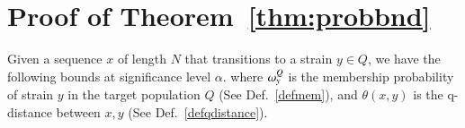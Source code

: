 \documentclass[onecolumn,10pt]{IEEEtran}
\begin{document}
\section{Proof of Theorem~\ref{thm:probbnd}}\label{secproof}


\begin{thm}\label{thmbnd}
  Given a sequence  $x$ of length $N$ that transitions  to a strain $y\in Q$, we have the following bounds at significance level $\alpha$.
  where $\omega_{y}^Q$ is the membership probability of strain $y$ in the target population $Q$ (See Def.~\ref{defmem}), and $\theta(x,y)$ is the q-distance between $x,y$ (See Def.~\ref{defqdistance}).
\end{thm}
\end{document}
